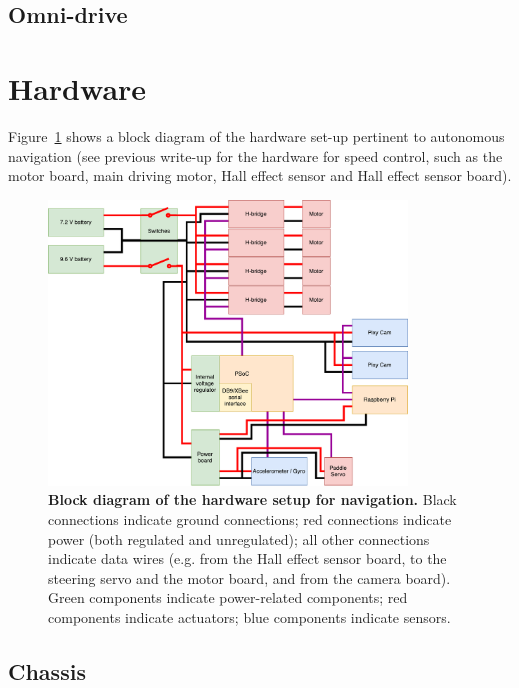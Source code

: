 \documentclass[letterpaper, 11pt]{article}
\begin{document}
\begin{enumerate}[label=\textbf{\arabic*.}]
\subsection{Omni-drive}

\section{Hardware}

Figure~\ref{fig:blockdiagram} shows a block diagram of the hardware set-up pertinent to autonomous navigation (see previous write-up for the hardware for speed control, such as the motor board, main driving motor, Hall effect sensor and Hall effect sensor board).
\begin{figure}[ht]
    \centering
    \includegraphics[width=0.85\textwidth]{images/BlockDiagram.pdf}
    \caption{\textbf{Block diagram of the hardware setup for navigation.} Black connections indicate ground connections; red connections indicate power (both regulated and unregulated); all other connections indicate data wires (e.g. from the Hall effect sensor board, to the steering servo and the motor board, and from the camera board). Green components indicate power-related components; red components indicate actuators; blue components indicate sensors.}
    \label{fig:blockdiagram}
\end{figure}

\subsection{Chassis}


\end{enumerate}
\end{document}
